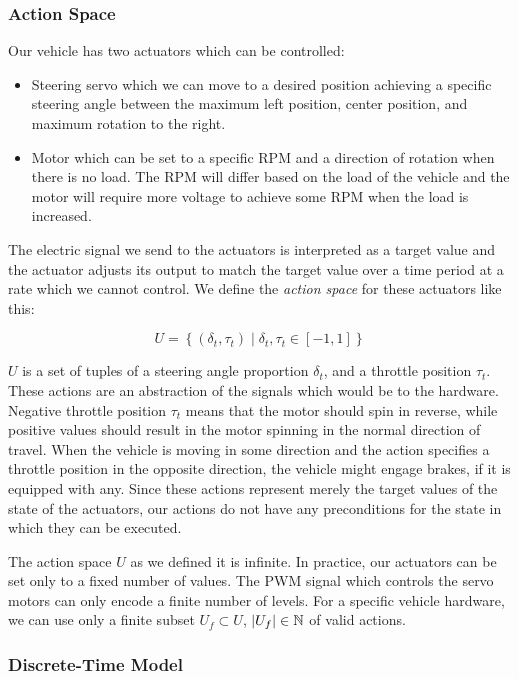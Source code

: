 \subsubsection{Action Space}

Our vehicle has two actuators which can be controlled:
\begin{itemize}
	\item Steering servo which we can move to a desired position achieving a specific steering angle between the maximum left position, center position, and maximum rotation to the right.
	
	\item Motor which can be set to a specific \gls{RPM} and a direction of rotation when there is no load. The \gls*{RPM} will differ based on the load of the vehicle and the motor will require more voltage to achieve some RPM when the load is increased.
\end{itemize}

The electric signal we send to the actuators is interpreted as a target value and the actuator adjusts its output to match the target value over a time period at a rate which we cannot control. We define the \textit{action space} for these actuators like this:

\[
	U=\left\{ \left( \delta_t,\tau_t\right) \mid \delta_t,\tau_t\in\left[-1, 1\right] \right\}
\]

$U$ is a set of tuples of a steering angle proportion $\delta_t$, and a throttle position $\tau_t$. These actions are an abstraction of the signals which would be to the hardware. Negative throttle position $\tau_t$ means that the motor should spin in reverse, while positive values should result in the motor spinning in the normal direction of travel. When the vehicle is moving in some direction and the action specifies a throttle position in the opposite direction, the vehicle might engage brakes, if it is equipped with any. Since these actions represent merely the target values of the state of the actuators, our actions do not have any preconditions for the state in which they can be executed.

The action space $U$ as we defined it is infinite. In practice, our actuators can be set only to a fixed number of values. The \gls*{PWM} signal which controls the servo motors can only encode a finite number of levels. For a specific vehicle hardware, we can use only a finite subset $U_f\subset U$, $\left|{U_f}\right|\in\mathbb{N}$ of valid actions.

\subsubsection{Discrete-Time Model}

